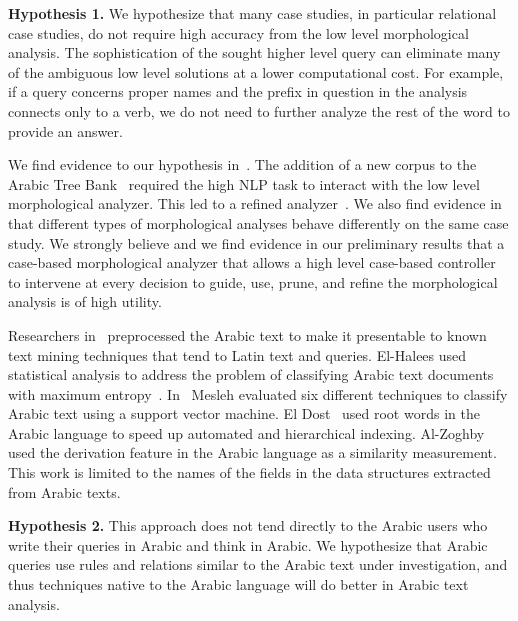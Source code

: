 \documentclass[12pt]{article}
\begin{document}
{\bf Hypothesis 1.} We hypothesize that many case studies, 
in particular relational
case studies, do not require high accuracy from the 
low level morphological analysis.
The sophistication of the sought higher level query can eliminate 
many of the ambiguous low level solutions at a lower computational 
cost.
For example, if a query concerns proper names and the 
prefix in question in the analysis connects only to a verb, 
we do not need to further analyze the rest of the word 
to provide an answer.

We find evidence to our hypothesis in~\cite{Maamouri:10}. The 
addition of a new corpus to the Arabic Tree Bank~\cite{Maamouri:04}
required the high NLP task to interact with the low 
level morphological analyzer.
This led to a refined analyzer~\cite{Kulick:10}.  
We also find evidence in~\cite{Habash:06} that different types of 
morphological analyses behave differently on the same case study. 
We strongly believe and we find evidence in our preliminary
results that a 
case-based morphological analyzer that allows a high level 
case-based controller to intervene at every decision to 
guide, use, prune, and refine the morphological analysis
is of high utility.

Researchers in~\cite{AEL07,Ham07,Abd07,MEl03} 
preprocessed the Arabic text to make it presentable to known text 
mining techniques that tend to Latin text and queries.
El-Halees used statistical analysis to address the problem of 
classifying Arabic text documents with maximum 
entropy~\cite{AEL07}.
In~\cite{Abd07} Mesleh evaluated six different techniques to 
classify Arabic text using a support vector machine.
El Dost~\cite{MEl03} used root words in the Arabic language to 
speed up automated and hierarchical indexing.
Al-Zoghby~\cite{Ham07}
used the derivation feature in 
the Arabic language as a similarity measurement.
This work is limited to the names of the fields in the data 
structures extracted from Arabic texts.

{\bf Hypothesis 2.} This approach does not tend directly to 
the Arabic users who write their 
queries in Arabic and think in Arabic.
We hypothesize that Arabic queries use rules and 
relations similar to the Arabic text under investigation, 
and thus techniques native to the Arabic language will do better 
in Arabic text analysis.
\end{document}
